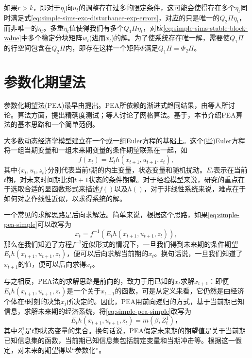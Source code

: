 如果$r>k$，即对于$\eta_t$向$u_t$的调整存在过多的限定条件，这可能会使得存在多个$\eta_t$同时满足式\eqref{eq:simple-sims-exo-disturbance-exp-errors}，对应的只是唯一的$Q_2 \Pi \eta_t$，而非唯一的$\eta_t$。多重$\eta_t$值使得我们有多个$Q_1 \Pi \eta_t$，对应\eqref{eq:simple-sims-stable-block-value}中多个稳定分块矩阵$w_t$(进而$x_t$)的解。为了使系统存在唯一解，需要使$Q_1 \Pi$的行空间包含在$Q_2 \Pi$内，即存在这样一个矩阵$\Phi$满足$Q_1 \Pi = \Phi _2 \Pi$。


\section{参数化期望法}
\label{sec:simple-pea-algorithm}

参数化期望法(PEA)最早由\cite{denHaan:1990bt}提出。PEA所依赖的渐进式趋同结果，由\cite{Marcet:1989do, Marcet:1994vw, Marcet:1999kj}等人所讨论。算法方面，\cite{denHaan:1994ej}提出精确度测试；\cite{Christiano:2000bw}等人讨论了网格算法。基于\cite{denHaan:1990bt}，本节介绍PEA算法的基本思路和一个简单范例。

大多数动态经济学模型建立在一个或一组Euler方程的基础上。这个(些)Euler方程将一组当期变量和一组未来期变量的条件期望联系在一起，如
\begin{equation}
  \label{eq:simple-pea-simple}
  f(x_t) = E_t h(x_{t+1}, u_{t+1}, z_t),
\end{equation}
其中$\{x_t, u_t, z_t\}$分别代表当前$t$期的内生变量，状态变量和随机扰动。$E_t$表示在当前$t$期，对未来时间期比如$t+1$状态的条件期望。对于经验模型来说，研究的重点在于选取合适的显函数形式来描述$f()$以及$h()$，对于非线性系统来说，难点在于如何对之作线性近似，以求得系统的解。

一个常见的求解思路是后向求解法。简单来说，根据这个思路，如果\eqref{eq:simple-pea-simple}可以改写为
\begin{equation*}
  x_t = f^{-1} \left(E_{t} h(x_{t+1}, u_{t+1}, z_t)\right),
\end{equation*}
那么在我们知道了方程$f^{-1}$近似形式的情况下，一旦我们得到未来期的条件期望$E_{t} h(x_{t+1}, u_{t+1}, z_t)$，便可以后向求解当前期的$x_t$。换句话说，一旦我们知道了$x_{t+1}$的值，便可以后向求得$x_{t}$。

与之相反，PEA法的求解思路是前向的，致力于用已知的$x_{t}$求解$x_{t+1}$：即便$E_{t} h(x_{t+1}, u_{t+1}, z_t)$是一个关于$x_{t+1}$的函数，可是从定义来看，它仍然是由经济个体在$t$时刻的决策$x_t$所决定的。因此，PEA用前向递归的方式，基于当前期已知信息，求解未来期的经济系统，将\eqref{eq:simple-pea-simple}改写为
\begin{equation}
  \label{eq:simple-pea-basic-thinking}
  E_t h(x_{t+1}, u_{t+1}, z_t) = m(\beta, Z_{t}^{1})，
\end{equation}
其中$Z_t^1$是$t$期状态变量的集合。换句话说，PEA假定未来期的期望值是关于当前期已知信息集的函数，当前期已知信息集包括前定变量和当期冲击等。根据这一假定，对未来的期望得以``参数化''。

